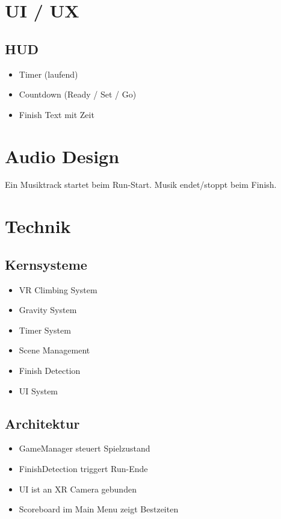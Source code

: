 \documentclass[11pt,a4paper]{article}
\begin{document}
\section{UI / UX}

\subsection{HUD}

\begin{itemize}
    \item Timer (laufend)
    \item Countdown (Ready / Set / Go)
    \item Finish Text mit Zeit
\end{itemize}

\section{Audio Design}

Ein Musiktrack startet beim Run-Start. Musik endet/stoppt beim Finish.

\section{Technik}

\subsection{Kernsysteme}

\begin{itemize}
    \item VR Climbing System
    \item Gravity System
    \item Timer System
    \item Scene Management
    \item Finish Detection
    \item UI System
\end{itemize}

\subsection{Architektur}

\begin{itemize}
    \item GameManager steuert Spielzustand
    \item FinishDetection triggert Run-Ende
    \item UI ist an XR Camera gebunden
    \item Scoreboard im Main Menu zeigt Bestzeiten
\end{itemize}
\end{document}

